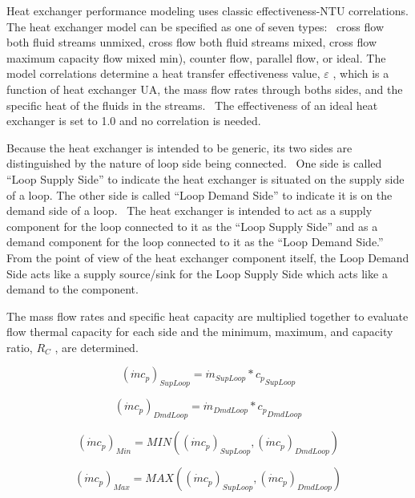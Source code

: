 Heat exchanger performance modeling uses classic effectiveness-NTU correlations. The heat exchanger model can be specified as one of seven types: ~cross flow both fluid streams unmixed, cross flow both fluid streams mixed, cross flow maximum capacity flow mixed min), counter flow, parallel flow, or ideal. The model correlations determine a heat transfer effectiveness value, \(\varepsilon\) , which is a function of heat exchanger UA, the mass flow rates through boths sides, and the specific heat of the fluids in the streams.~ The effectiveness of an ideal heat exchanger is set to 1.0 and no correlation is needed.

Because the heat exchanger is intended to be generic, its two sides are distinguished by the nature of loop side being connected.~ One side is called ``Loop Supply Side'' to indicate the heat exchanger is situated on the supply side of a loop. The other side is called ``Loop Demand Side'' to indicate it is on the demand side of a loop.~ The heat exchanger is intended to act as a supply component for the loop connected to it as the ``Loop Supply Side'' and as a demand component for the loop connected to it as the ``Loop Demand Side.''~ From the point of view of the heat exchanger component itself, the Loop Demand Side acts like a supply source/sink for the Loop Supply Side which acts like a demand to the component.

The mass flow rates and specific heat capacity are multiplied together to evaluate flow thermal capacity for each side and the minimum, maximum, and capacity ratio, \({R_C}\) , are determined.

\begin{equation}
{\left( {\dot m{c_p}} \right)_{SupLoop}} = {\dot m_{SupLoop}}*{c_p}_{SupLoop}
\end{equation}

\begin{equation}
{\left( {\dot m{c_p}} \right)_{DmdLoop}} = {\dot m_{DmdLoop}}*{c_p}_{DmdLoop}
\end{equation}

\begin{equation}
{\left( {\dot m{c_p}} \right)_{Min}} = MIN\left( {{{\left( {\dot m{c_p}} \right)}_{SupLoop}},{{\left( {\dot m{c_p}} \right)}_{DmdLoop}}} \right)
\end{equation}

\begin{equation}
{\left( {\dot m{c_p}} \right)_{Max}} = MAX\left( {{{\left( {\dot m{c_p}} \right)}_{SupLoop}},{{\left( {\dot m{c_p}} \right)}_{DmdLoop}}} \right)
\end{equation}

